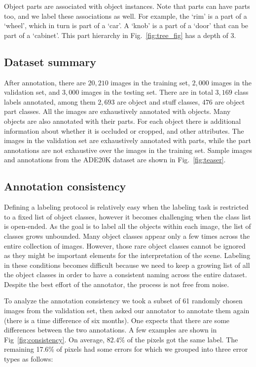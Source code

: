 Object parts are associated with object instances. Note that parts can have parts too, and we label these associations as well. For example, the `rim' is a part of a `wheel', which in turn is part of a `car'. A `knob' is a part of a `door' that can be part of a `cabinet'. This part hierarchy in Fig.~\ref{fig:tree_fig} has a depth of 3.

\subsection{Dataset summary} After annotation, there are $20,210$ images in the training set, $2,000$ images in the validation set, and $3,000$ images in the testing set. There are in total $3,169$ class labels annotated, among them $2,693$ are object and stuff classes, $476$ are object part classes. All the images are exhaustively annotated with objects. Many objects are also annotated with their parts. For each object there is additional information about whether it is occluded or cropped, and other attributes. The images in the validation set are exhaustively annotated with parts, while the part annotations are not exhaustive over the images in the training set. Sample images and annotations from the ADE20K dataset are shown in Fig.~\ref{fig:teaser}. 

\subsection{Annotation consistency}
\label{sec:consistency}
Defining a labeling protocol is relatively easy when the labeling task is restricted to a fixed list of object classes, however it becomes challenging when the class list is open-ended. As the goal is to label all the objects within each image, the list of classes grows unbounded. Many object classes appear only a few times across the entire collection of images. However, those rare object classes cannot be ignored as they might be important elements for the interpretation of the scene. Labeling in these conditions becomes difficult because we need to keep a growing list of all the object classes in order to have a consistent naming across the entire dataset. Despite the best effort of the annotator, the process is not free from noise. 

To analyze the annotation consistency we took a subset of 61 randomly chosen images from the validation set, then asked our annotator to annotate them again (there is a time difference of six months). One expects that there are some differences between the two annotations. A few examples are shown in Fig~\ref{fig:consistency}. On average, $82.4\%$ of the pixels got the same label. The remaining 17.6\% of pixels had some errors for which we grouped into three error types as follows:

